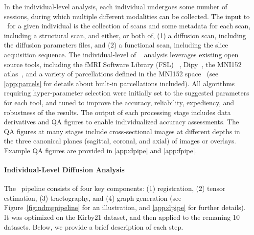 \documentclass[11pt]{article}
\begin{document}
\begin{multicols}{2}
%

In the individual-level analysis, each individual  undergoes some number of sessions, during which multiple different modalities can be collected.
The input to \ndmg~for a given individual is  the collection of scans and some metadata for each scan, including a structural scan, %
and either, or both of, (1) a diffusion scan, including the diffusion parameters files,  and (2) a functional scan, including the slice acquisition sequence.
The individual-level of \ndmg~ analysis leverages existing open source tools, including
the fMRI Software Library (FSL) ~\cite{fsl1, fsl2, fsl3}, Dipy~\cite{dipy}, the MNI152 atlas~\cite{mni152}, and a variety of parcellations defined in the MNI152 space~\cite{desikan, aal, jhu, harvardoxford, talairach, slab907, slab1068, pvt, glasser} (see \ref{app:parcels} for details about built-in parcellations included). 
All algorithms requiring hyper-parameter selection were initially set to the suggested parameters for each tool, and tuned to improve the accuracy, reliability, expediency, and robustness of the results.
The output of each processing stage includes data derivatives and QA figures to enable individualized accuracy assessments.
The QA figures at many stages include cross-sectional images at different depths in the three canonical planes (sagittal, coronal, and axial) of images or overlays. Example QA figures are provided in \ref{app:dpipe} and \ref{app:fpipe}.

\paragraph{Individual-Level Diffusion Analysis}

The \ndmgd~pipeline consists of four key components: (1) registration, (2) tensor estimation, (3) tractography, and (4) graph generation (see Figure~\ref{fig:ndmgpipeline} for an illustration, and 
\ref{app:dpipe} for further details). It was optimized on the Kirby21 dataset, and then applied to the remaning 10 datasets.
Below, we provide a brief description of each step.


\end{multicols}
\end{document}
